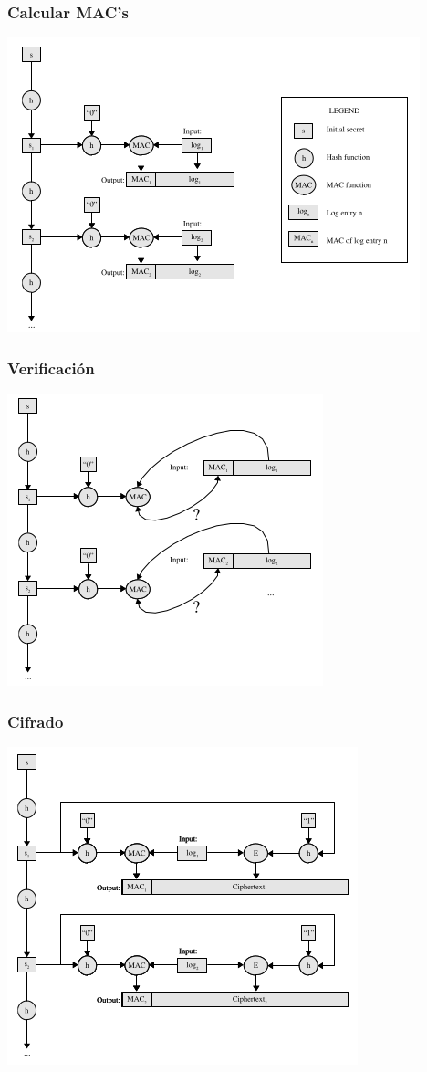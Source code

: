 \documentclass[10pt, a4paper,english,spanish]{beamer}
\begin{document}
\begin{frame}
\frametitle{Calcular MAC's}

  \includegraphics[scale=0.6]{imagenes/MAC.png}
\end{frame}

\begin{frame}
\frametitle{Verificación}
  \includegraphics[scale=0.6]{imagenes/Verification.png}
\end{frame}

\begin{frame}
\frametitle{Cifrado}
  \includegraphics[scale=0.6]{imagenes/Cipher.png}
\end{frame}
\end{document}
